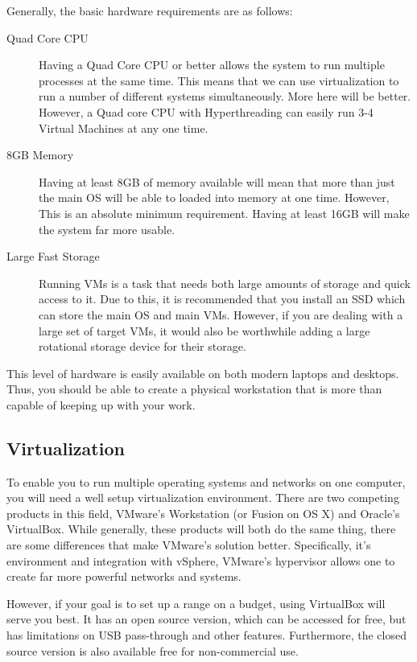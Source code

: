 			Generally, the basic hardware requirements are as follows:
			\begin{description}
				\item[Quad Core CPU] Having a Quad Core CPU or better allows the system to run multiple processes at the same time. 
					This means that we can use virtualization to run a number of different systems simultaneously. 
					More here will be better. However, a Quad core CPU with Hyperthreading can easily run 3-4 Virtual Machines at any one time. 
				\item[8GB Memory] Having at least 8GB of memory available will mean that more than just the main OS will be able to loaded into memory at one time. 
					However, This is an absolute minimum requirement. 
					Having at least 16GB will make the system far more usable. 
				\item[Large Fast Storage] Running VMs is a task that needs both large amounts of storage and quick access to it. 
					Due to this, it is recommended that you install an SSD which can store the main OS and main VMs. 
					However, if you are dealing with a large set of target VMs, it would also be worthwhile adding a large rotational storage device for their storage. 
			\end{description}

			This level of hardware is easily available on both modern laptops and desktops. 
			Thus, you should be able to create a physical workstation that is more than capable of keeping up with your work. 
			
		\subsection{Virtualization}
			To enable you to run multiple operating systems and networks on one computer, you will need a well setup virtualization environment. 
			There are two competing products in this field, VMware's Workstation (or Fusion on OS X) and Oracle's VirtualBox. 
			While generally, these products will both do the same thing, there are some differences that make VMware's solution better. 
			Specifically, it's environment and integration with vSphere, VMware's hypervisor allows one to create far more powerful networks and systems. 
			
			However, if your goal is to set up a range on a budget, using VirtualBox will serve you best. 
			It has an open source version, which can be accessed for free, but has limitations on USB pass-through and other features. 
			Furthermore, the closed source version is also available free for non-commercial use. 

